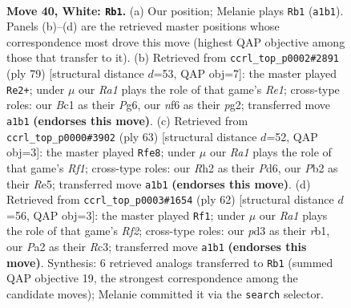 \documentclass[11pt]{article}
\begin{document}
\clearpage

\begin{figure}[p]\centering
\begin{subfigure}{0.46\textwidth}\centering
\resizebox{\linewidth}{!}{%
\newchessgame
\chessboard[
  setfen={5k2/5prr/5n2/8/p3p2p/3p3P/PP3P1R/R1B1K3 w - - 20 40},
  showmover=false,
  pgfstyle=straightmove, color=movearrow, markmove={a1-b1}
]}
\caption{}
\end{subfigure}\hfill
\begin{subfigure}{0.46\textwidth}\centering
\resizebox{\linewidth}{!}{%
\newchessgame
\chessboard[
  setfen={4r3/2r2pk1/2p3p1/p6p/P7/1PPR1R1P/2K3P1/8 b - - 10 40},
  showmover=false,
  pgfstyle=straightmove, color=movearrow, markmove={e8-e2}
]}
\caption{}
\end{subfigure}
\\[4pt]
\begin{subfigure}{0.46\textwidth}\centering
\resizebox{\linewidth}{!}{%
\newchessgame
\chessboard[
  setfen={5r1k/1b5p/p2p4/1p2rp2/5N2/P2PR3/1P4PP/4R1K1 b - - 0 32},
  showmover=false,
  pgfstyle=straightmove, color=movearrow, markmove={f8-e8}
]}
\caption{}
\end{subfigure}\hfill
\begin{subfigure}{0.46\textwidth}\centering
\resizebox{\linewidth}{!}{%
\newchessgame
\chessboard[
  setfen={5rk1/1N3ppn/4p2p/1p6/4PPP1/2RP3P/5RK1/1r6 w - - 2 32},
  showmover=false,
  pgfstyle=straightmove, color=movearrow, markmove={f2-f1}
]}
\caption{}
\end{subfigure}
\caption{\textbf{Move 40, White: \texttt{Rb1}.} (a) Our position; Melanie plays \texttt{Rb1} (\texttt{a1b1}). Panels (b)--(d) are the retrieved master positions whose correspondence most drove this move (highest QAP objective among those that transfer to it). (b) Retrieved from \texttt{ccrl\_top\_p0002\#2891} (ply 79) [structural distance $d$=53, QAP obj=7]: the master played \texttt{Re2+}; under $\mu$ our \emph{Ra1} plays the role of that game's \emph{Re1}; cross-type roles: our \emph{B}c1 as their \emph{P}g6, our \emph{n}f6 as their \emph{p}g2; transferred move \texttt{a1b1} \textbf{(endorses this move)}. (c) Retrieved from \texttt{ccrl\_top\_p0000\#3902} (ply 63) [structural distance $d$=52, QAP obj=3]: the master played \texttt{Rfe8}; under $\mu$ our \emph{Ra1} plays the role of that game's \emph{Rf1}; cross-type roles: our \emph{R}h2 as their \emph{P}d6, our \emph{P}b2 as their \emph{R}e5; transferred move \texttt{a1b1} \textbf{(endorses this move)}. (d) Retrieved from \texttt{ccrl\_top\_p0003\#1654} (ply 62) [structural distance $d$=56, QAP obj=3]: the master played \texttt{Rf1}; under $\mu$ our \emph{Ra1} plays the role of that game's \emph{Rf2}; cross-type roles: our \emph{p}d3 as their \emph{r}b1, our \emph{P}a2 as their \emph{R}c3; transferred move \texttt{a1b1} \textbf{(endorses this move)}. Synthesis: 6 retrieved analogs transferred to \texttt{Rb1} (summed QAP objective 19, the strongest correspondence among the candidate moves); Melanie committed it via the \texttt{search} selector.}
\label{fig:thought-m78}
\end{figure}
\end{document}
